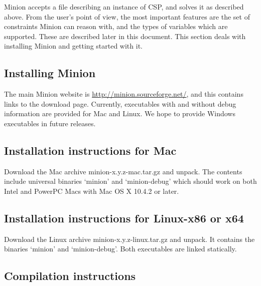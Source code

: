 \documentclass[oneside]{book}
\begin{document}
Minion accepts a file describing an instance of CSP, and solves it
as described above. From the user's point of view, the most important
features are the set of constraints Minion can reason with, and the
types of variables which are supported. These are described later
in this document. This section deals with installing Minion and getting
started with it.


\subsection{Installing Minion}

The main Minion website is \url{http://minion.sourceforge.net/},
and this contains links to the download page. Currently, executables with and
without debug information are provided for Mac and Linux. We hope to provide
Windows executables in future releases.


%
%

\subsection{Installation instructions for Mac}

Download the Mac archive minion-x.y.z-mac.tar.gz and unpack. The contents
include universal binaries `minion' and `minion-debug' which should
work on both Intel and PowerPC Macs with Mac OS X 10.4.2 or later.


\subsection{Installation instructions for Linux-x86 or x64}

Download the Linux archive minion-x.y.z-linux.tar.gz and unpack. It contains
the binaries `minion' and `minion-debug'. Both executables are linked
statically.


\subsection{Compilation instructions}
\end{document}

